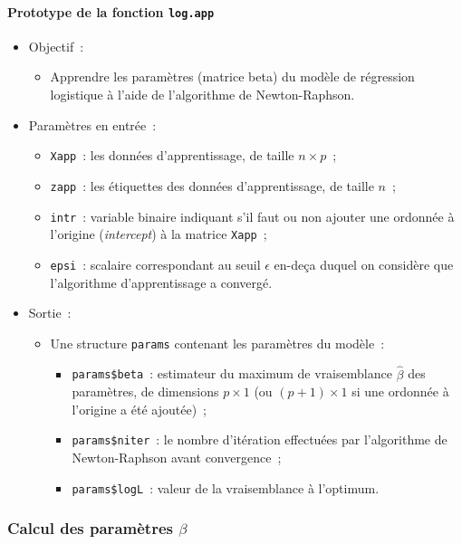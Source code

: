 \documentclass[a4paper,10pt]{report}
\begin{document}
\paragraph{Prototype de la fonction \texttt{log.app}}
\begin{itemize}
	\item Objectif~:
	\begin{itemize}
		\item Apprendre les paramètres (matrice beta) du modèle de régression logistique à l'aide de l'algorithme de Newton-Raphson.
	\end{itemize}
	
	\item Paramètres en entrée~:
	\begin{itemize}
		\item \texttt{Xapp}~: les données d'apprentissage, de taille $n \times p$~;
		\item \texttt{zapp}~: les étiquettes des données d'apprentissage, de taille $n$~;
		\item \texttt{intr}~: variable binaire indiquant s'il faut ou non ajouter une ordonnée à l'origine (\textit{intercept}) à la matrice \texttt{Xapp}~;
		\item \texttt{epsi}~: scalaire correspondant au seuil $\epsilon$ en-deça duquel on considère que l’algorithme d’apprentissage a convergé.
	\end{itemize}
	
	\item Sortie~:
	\begin{itemize}
		\item Une structure \texttt{params} contenant les paramètres du modèle~:
		\begin{itemize}
			\item \texttt{params\$beta}~: estimateur du maximum de vraisemblance $\hat{\beta}$ des paramètres, de dimensions $p \times 1$ (ou $(p+1) \times 1$ si une ordonnée à l’origine a été ajoutée)~;
			\item \texttt{params\$niter}~: le nombre d'itération effectuées par l'algorithme de Newton-Raphson avant convergence~;
			\item \texttt{params\$logL}~: valeur de la vraisemblance à l’optimum.
		\end{itemize}
	\end{itemize}
\end{itemize}


\subsubsection{Calcul des paramètres $\beta$}
\end{document}

